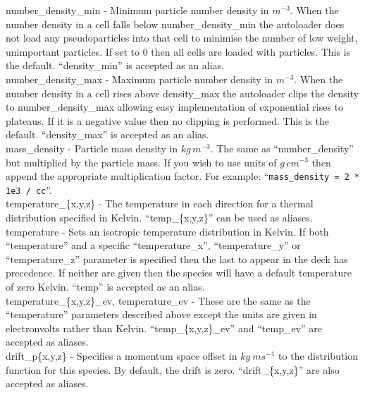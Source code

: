 {\emphtext number\_density\_min} - Minimum particle number density in $m^{-3}$.
When the number density in a cell falls below number\_density\_min the
autoloader does not load any pseudoparticles into that cell to minimise the
number of low weight, unimportant particles. If set to 0 then all cells are
loaded with particles. This is the default. ``density\_min'' is accepted
as an alias.\\

{\emphtext number\_density\_max} - Maximum particle number density in $m^{-3}$.
When the number density in a cell rises above density\_max the
autoloader clips the density to number\_density\_max allowing easy
implementation of exponential rises to plateaus. If it is a negative value
then no clipping is performed. This is the default. ``density\_max'' is accepted
as an alias.\\

{\emphtext mass\_density} - Particle mass density in $kg\,m^{-3}$. The same
as ``number\_density'' but multiplied by the particle mass. If you wish to use
units of $g\,cm^{-3}$ then append the appropriate multiplication factor.
For example: ``\verb|mass_density = 2 * 1e3 / cc|''.\\

{\emphtext temperature\_\{x,y,z\}} - The temperature in each direction for a
thermal distribution specified in Kelvin. ``temp\_\{x,y,z\}'' can be used as
aliases.\\

{\emphtext temperature} - Sets an isotropic temperature distribution in Kelvin.
If both ``temperature'' and a specific ``temperature\_x'', ``temperature\_y''
or ``temperature\_z'' parameter is specified then the last to appear in the
deck has precedence. If neither are given then the species will have a
default temperature of zero Kelvin. ``temp'' is accepted as an alias.\\

{\emphtext temperature\_\{x,y,z\}\_ev, temperature\_ev} - These are the same
as the ``temperature'' parameters described above except the units are given
in electronvolts rather than Kelvin. ``temp\_\{x,y,z\}\_ev'' and ``temp\_ev''
are accepted as aliases.\\

{\emphtext drift\_p\{x,y,z\}} - Specifies a momentum space offset in
$kg\ ms^{-1}$ to the distribution function for this species. By default,
the drift is zero. ``drift\_\{x,y,z\}'' are also accepted as aliases.\\

